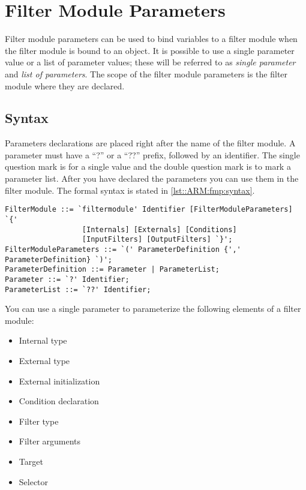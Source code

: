 \chapter{Filter Module Parameters}
Filter module parameters can be used to bind variables to a filter module when the filter module is bound to an object.
It is possible to use a single parameter value or a list of parameter values; these will be referred to as \emph{single parameter} and \emph{list of parameters}.
The scope of the filter module parameters is the filter module where they are declared.

\section{Syntax}
Parameters declarations are placed right after the name of the filter module. 
A parameter must have a ``?'' or a ``??'' prefix, followed by an identifier.
The single question mark is for a single value and the double question mark is to mark a parameter list.
After you have declared the parameters you can use them in the filter module. The formal syntax is stated in \autoref{lst::ARM:fmp:syntax}.

\begin{lstlisting}[caption = {Parameter declaration syntax}, label = lst::ARM:fmp:syntax,
style = listing, language = ebnf, float = tpb]
FilterModule ::= `filtermodule' Identifier [FilterModuleParameters] `{'
                  [Internals] [Externals] [Conditions]
                  [InputFilters] [OutputFilters] `}';                                    
FilterModuleParameters ::= `(' ParameterDefinition {',' ParameterDefinition} `)';
ParameterDefinition ::= Parameter | ParameterList;
Parameter ::= `?' Identifier;
ParameterList ::= `??' Identifier;
\end{lstlisting}

You can use a single parameter to parameterize the following elements of a filter module:%
\begin{itemize}[noitemsep]
\item Internal type
\item External type
\item External initialization
\item Condition declaration
\item Filter type
\item Filter arguments
\item Target
\item Selector
\end{itemize}

